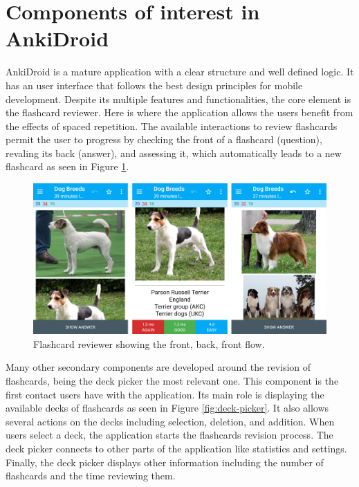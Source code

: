 \section{Components of interest in AnkiDroid}
\label{desi-components-interest}
AnkiDroid is a mature application with a clear structure and well defined logic. It has an user interface that follows the best design principles for mobile development. Despite its multiple features and functionalities, the core element is the flashcard reviewer. Here is where the application allows the users benefit from the effects of spaced repetition. The available interactions to review flashcards permit the user to progress by checking the front of a flashcard (question), revaling its back (answer), and assessing it, which automatically leads to a new flashcard as seen in Figure \ref{fig:front-back-assess}.

\begin{figure}[htb]
    \vskip 5mm
        \begin{center}
            \includegraphics[scale=0.28]{./Figures/reviewer.png}
            \caption{Flashcard reviewer showing the front, back, front flow.}
            \label{fig:front-back-assess}
        \end{center}
    \vskip -5mm
\end{figure}

Many other secondary components are developed around the revision of flashcards, being the deck picker the most relevant one. This component is the first contact users have with the application. Its main role is displaying the available decks of flashcards as seen in Figure \ref{fig:deck-picker}. It also allows several actions on the decks including selection, deletion, and addition. When users select a deck, the application starts the flashcards revision process. The deck picker connects to other parts of the application like statistics and settings. Finally, the deck picker displays other information including the number of flashcards and the time reviewing them.

